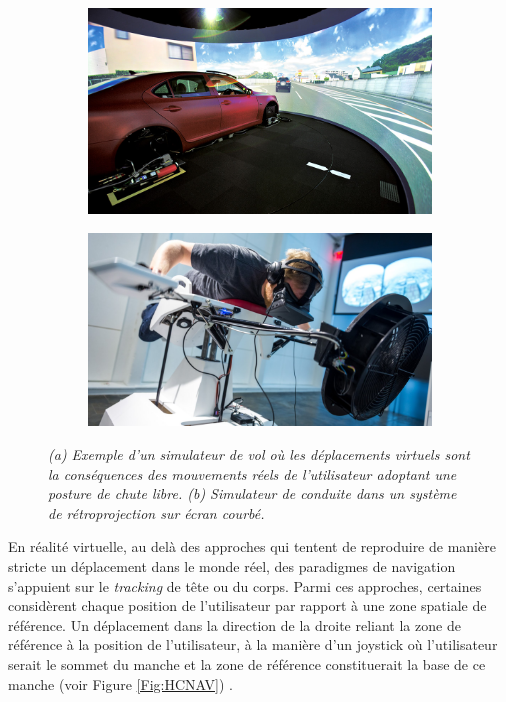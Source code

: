 \begin{figure}[h]
  \begin{subfigure}{.5\textwidth}
  \centering
  {\includegraphics[width=0.9\linewidth]{./figures/ch3/driving_simu}}
    \caption{}
    \label{Fig:driving_simu}
  \end{subfigure}
  \begin{subfigure}{.5\textwidth}
  \centering
  {\includegraphics[width=0.9\linewidth]{./figures/ch3/flight_simu}}
    \caption{}
    \label{Fig:flight_simu}
  \hspace{0.3cm}
  \end{subfigure}
  \caption[(a) Exemple d'un simulateur de vol. (b) Exemple d'un simulateur de conduite.]{\it(a) Exemple d'un simulateur de vol où les déplacements virtuels sont la conséquences des mouvements réels de l'utilisateur adoptant une posture de chute libre.
  (b) Simulateur de conduite dans un système de rétroprojection sur écran courbé.
  }
\end{figure}


En réalité virtuelle, au delà des approches qui tentent de reproduire de manière stricte un déplacement dans le monde réel, des paradigmes de navigation s'appuient sur le \textit{tracking} de tête ou du corps. Parmi ces approches, certaines considèrent chaque position de l'utilisateur par rapport à une zone spatiale de référence. Un déplacement dans la direction de la droite reliant la zone de référence à la position de l'utilisateur, à la manière d'un joystick où l'utilisateur serait le sommet du manche et la zone de référence constituerait la base de ce manche (voir Figure \ref{Fig:HCNAV}) \cite{Bourdot2002HCNav}.

